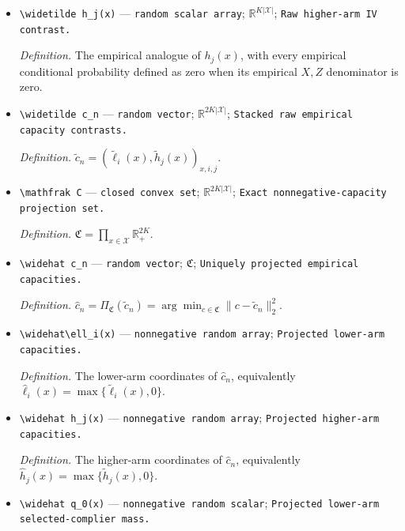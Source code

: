 \documentclass{article}
\begin{document}
\begin{itemize}
  \item \texttt{\textbackslash{}\allowbreak{}widetilde h\_\allowbreak{}j(x)} --- \texttt{random scalar array}; \(\mathbb R^{K|\mathcal X|}\); \texttt{Raw higher-\allowbreak{}arm IV contrast.}
  \par\smallskip\noindent\emph{Definition.} The empirical analogue of \(h_j(x)\), with every empirical conditional probability defined as zero when its empirical \(X,Z\) denominator is zero.
  \item \texttt{\textbackslash{}\allowbreak{}widetilde c\_\allowbreak{}n} --- \texttt{random vector}; \(\mathbb R^{2K|\mathcal X|}\); \texttt{Stacked raw empirical capacity contrasts.}
  \par\smallskip\noindent\emph{Definition.} \(\widetilde c_n=(\widetilde\ell_i(x),\widetilde h_j(x))_{x,i,j}\).
  \item \texttt{\textbackslash{}\allowbreak{}mathfrak C} --- \texttt{closed convex set}; \(\mathbb R^{2K|\mathcal X|}\); \texttt{Exact nonnegative-\allowbreak{}capacity projection set.}
  \par\smallskip\noindent\emph{Definition.} \(\mathfrak C=\prod_{x\in\mathcal X}\mathbb R_+^{2K}\).
  \item \texttt{\textbackslash{}\allowbreak{}widehat c\_\allowbreak{}n} --- \texttt{random vector}; \(\mathfrak C\); \texttt{Uniquely projected empirical capacities.}
  \par\smallskip\noindent\emph{Definition.} \(\widehat c_n=\Pi_{\mathfrak C}(\widetilde c_n)=\arg\min_{c\in\mathfrak C}\|c-\widetilde c_n\|_2^2\).
  \item \texttt{\textbackslash{}\allowbreak{}widehat\textbackslash{}\allowbreak{}ell\_\allowbreak{}i(x)} --- \texttt{nonnegative random array}; \texttt{Projected lower-\allowbreak{}arm capacities.}
  \par\smallskip\noindent\emph{Definition.} The lower-arm coordinates of \(\widehat c_n\), equivalently \(\widehat\ell_i(x)=\max\{\widetilde\ell_i(x),0\}\).
  \item \texttt{\textbackslash{}\allowbreak{}widehat h\_\allowbreak{}j(x)} --- \texttt{nonnegative random array}; \texttt{Projected higher-\allowbreak{}arm capacities.}
  \par\smallskip\noindent\emph{Definition.} The higher-arm coordinates of \(\widehat c_n\), equivalently \(\widehat h_j(x)=\max\{\widetilde h_j(x),0\}\).
  \item \texttt{\textbackslash{}\allowbreak{}widehat q\_\allowbreak{}0(x)} --- \texttt{nonnegative random scalar}; \texttt{Projected lower-\allowbreak{}arm selected-\allowbreak{}complier mass.}

\end{itemize}
\end{document}
